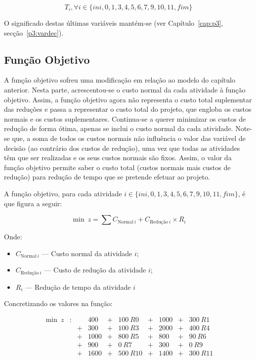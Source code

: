 $$T_i, \forall i \in \{ini, 0, 1, 3, 4,5,6,7,9,10,11,fim\}$$

O significado destas últimas variáveis mantém-se (ver Capítulo~\ref{cap:p3},
secção~\ref{p3:vardec}).


\subsection{Função Objetivo}
 
A função objetivo sofreu uma modificação em relação ao modelo do capítulo
anterior. Nesta parte, acrescentou-se o custo normal da cada atividade à função
objetivo. Assim, a função objetivo agora não representa o custo total
suplementar das reduções e passa a representar o custo total do projeto, que
engloba os custos normais e os custos suplementares. Continua-se a querer
minimizar os custos de redução de forma ótima, apenas se inclui o custo normal
da cada atividade. Note-se que, a soma de todos os custos normais não influência
o valor das variável de decisão (ao contrário dos custos de redução), uma vez
que todas as atividades têm que ser realizadas e os seus custos normais são
fixos.  Assim, o valor da função objetivo permite saber o custo total (custos
normais mais custos de redução) para redução de tempo que se pretende efetuar ao
projeto.


A função objetivo, para cada atividade $i \in \{ini, 0, 1, 3,
4,5,6,7,9,10,11,fim\}$, é que figura a seguir:

\begin{displaymath} 	
	\min~z = \sum C_{\text{Normal}~i} + C_{\text{Redução}~i} \times R_{i}
\end{displaymath}

Onde:

\begin{itemize} 
	
	\item $C_{\text{Normal}~i}$ --- Custo normal da atividade $i$;

	\item $C_{\text{Redução}~i}$ --- Custo de redução da atividade $i$;
	\item $R_{i}$ --- Redução de tempo da atividade $i$ 

\end{itemize}

Concretizando os valores na função:

\begin{align*}
	\min~z&:&   &400 & +& 100~R0 & +& 1000& +& 300~R1 \\
	      & & + &300 & +& 100~R3 & +& 2000& +& 400~R4 \\
		  & & + &1000& +& 800~R5 & +&  800& +&  90~R6 \\ 
		  & & + &900 & +& 0~R7 & +&  300& +&   0~R9 \\
		  & & + &1600& +& 500~R10& +& 1400& +& 300~R11 \\
\end{align*}

